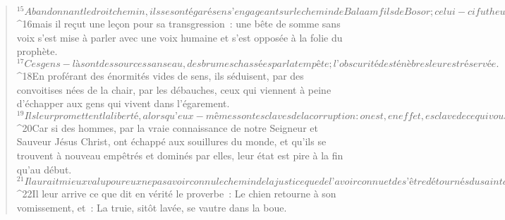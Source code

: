 \begin{verse}
${}^{15}Abandonnant le droit chemin, ils se sont égarés en s’engageant sur le chemin de Balaam fils de Bosor ; celui-ci fut heureux de recevoir un salaire d’injustice, 
${}^{16}mais il reçut une leçon pour sa transgression : une bête de somme sans voix s’est mise à parler avec une voix humaine et s’est opposée à la folie du prophète. 
${}^{17}Ces gens-là sont des sources sans eau, des brumes chassées par la tempête ; l’obscurité des ténèbres leur est réservée. 
${}^{18}En proférant des énormités vides de sens, ils séduisent, par des convoitises nées de la chair, par les débauches, ceux qui viennent à peine d’échapper aux gens qui vivent dans l’égarement. 
${}^{19}Ils leur promettent la liberté, alors qu’eux-mêmes sont esclaves de la corruption : on est, en effet, esclave de ce qui vous domine. 
${}^{20}Car si des hommes, par la vraie connaissance de notre Seigneur et Sauveur Jésus Christ, ont échappé aux souillures du monde, et qu’ils se trouvent à nouveau empêtrés et dominés par elles, leur état est pire à la fin qu’au début. 
${}^{21}Il aurait mieux valu pour eux ne pas avoir connu le chemin de la justice que de l’avoir connu et de s’être détournés du saint commandement qui leur avait été transmis. 
${}^{22}Il leur arrive ce que dit en vérité le proverbe : Le chien retourne à son vomissement, et : La truie, sitôt lavée, se vautre dans la boue.
      

\end{verse}
